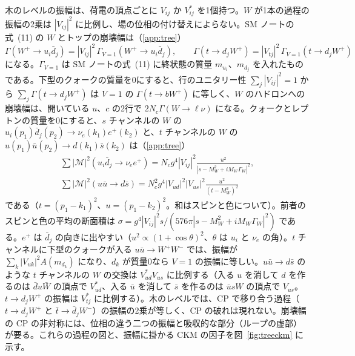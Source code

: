 \documentclass[a4paper,10pt]{ltjsarticle}
\begin{document}
木のレベルの振幅は、荷電の頂点ごとに $V_{ij}$ か $V_{ij}^*$ を1個持つ。$W$ が1本の過程の振幅の2乗は $|V_{ij}|^2$ に比例し、場の位相の付け替えによらない。SM ノートの式~(11) の $W$ とトップの崩壊幅は（\ref{app:tree}）
\begin{equation}
\Gamma(W^+\to u_i\bar d_j)=|V_{ij}|^2\,\Gamma_{V=1}(W^+\to u_i\bar d_j),\qquad
\Gamma(t\to d_jW^+)=|V_{tj}|^2\,\Gamma_{V=1}(t\to d_jW^+)
\label{eq:widthsckm}
\end{equation}
になる。$\Gamma_{V=1}$ は SM ノートの式~(11) に終状態の質量 $m_{u_i}$、$m_{d_j}$ を入れたものである。下型のクォークの質量を0にすると、行のユニタリー性 $\sum_j|V_{ij}|^2=1$ から $\sum_j\Gamma(t\to d_jW^+)$ は $V=1$ の $\Gamma(t\to bW^+)$ に等しく、$W$ のハドロンへの崩壊幅は、開いている $u$、$c$ の2行で $2N_c\Gamma(W\to\ell\nu)$ になる。クォークとレプトンの質量を0にすると、$s$ チャンネルの $W$ の $u_i(p_1)\bar d_j(p_2)\to\nu_e(k_1)e^+(k_2)$ と、$t$ チャンネルの $W$ の $u(p_1)\bar u(p_2)\to d(k_1)\bar s(k_2)$ は（\ref{app:tree}）
\begin{equation}
\begin{gathered}
\sum|\mathcal M|^2(u_i\bar d_j\to\nu_ee^+)=N_cg^4|V_{ij}|^2\frac{u^2}{|s-M_W^2+iM_W\Gamma_W|^2},\\
\sum|\mathcal M|^2(u\bar u\to d\bar s)=N_c^2g^4|V_{ud}|^2|V_{us}|^2\frac{u^2}{(t-M_W^2)^2}
\end{gathered}
\label{eq:qqbar}
\end{equation}
である（$t=(p_1-k_1)^2$、$u=(p_1-k_2)^2$。和はスピンと色について）。前者のスピンと色の平均の断面積は $\sigma=g^4|V_{ij}|^2s/(576\pi|s-M_W^2+iM_W\Gamma_W|^2)$ である。$e^+$ は $\bar d_j$ の向きに出やすい（$u^2\propto(1+\cos\theta)^2$、$\theta$ は $u_i$ と $\nu_e$ の角）。$t$ チャンネルに下型のクォークが入る $u\bar u\to W^+W^-$ では、振幅が $\sum_k|V_{uk}|^2A(m_{d_k})$ になり、$d_k$ が質量0なら $V=1$ の振幅に等しい。$u\bar u\to d\bar s$ のような $t$ チャンネルの $W$ の交換は $V_{ud}^*V_{us}$ に比例する（入る $u$ を消して $d$ を作るのは $\bar d u\bar W$ の頂点で $V_{ud}^*$、入る $\bar u$ を消して $\bar s$ を作るのは $\bar usW$ の頂点で $V_{us}$。$t\to d_jW^+$ の振幅は $V_{tj}^*$ に比例する）。木のレベルでは、CP で移り合う過程（$t\to d_jW^+$ と $\bar t\to\bar d_jW^-$）の振幅の2乗が等しく、CP の破れは現れない。崩壊幅の CP の非対称には、位相の違う二つの振幅と吸収的な部分（ループの虚部）が要る。これらの過程の図と、振幅に掛かる CKM の因子を図~\ref{fig:treeckm} に示す。
\end{document}
